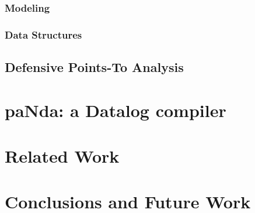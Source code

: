 \documentclass[ack,preface]{diphdthesis}
\begin{document}
\subsection{Modeling}

\subsection{Data Structures}


\section{Defensive Points-To Analysis}


\chapter{paNda: a Datalog compiler}


\chapter{Related Work}


\chapter{Conclusions and Future Work}


\backmatter
\end{document}
